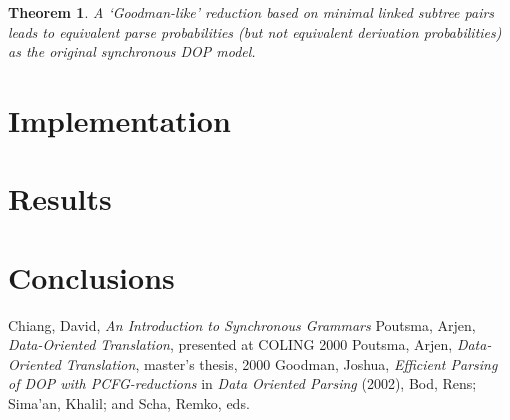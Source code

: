 \documentclass[a4paper]{article}
\newtheorem{theorem}{Theorem}[section]
\theoremstyle{definition}
\begin{document}
\begin{theorem}
A `Goodman-like' reduction based on minimal linked subtree pairs leads to equivalent parse probabilities (but not equivalent derivation probabilities) as the original synchronous DOP model.
\end{theorem}

\section{Implementation}

\section{Results}

\section{Conclusions}

\begin{thebibliography}{BlAbLa00}
 Chiang, David, \emph{An Introduction to Synchronous Grammars}
 Poutsma, Arjen, \emph{Data-Oriented Translation}, presented at COLING 2000
 Poutsma, Arjen, \emph{Data-Oriented Translation}, master's thesis, 2000
 Goodman, Joshua, \emph{Efficient Parsing of DOP with PCFG-reductions} in \emph{Data Oriented Parsing} (2002), Bod, Rens; Sima'an, Khalil; and Scha, Remko, eds.
\end{thebibliography}
\end{document}
